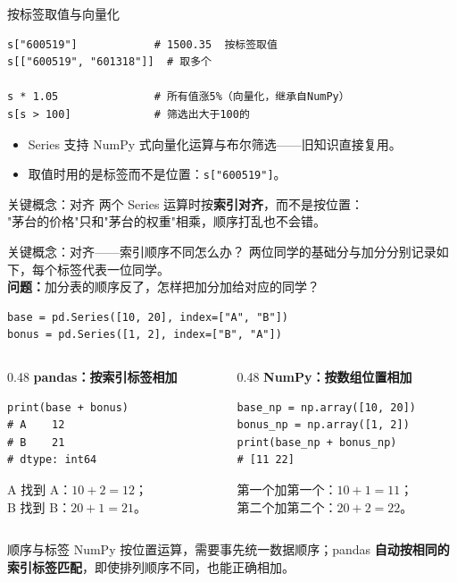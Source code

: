 \documentclass[9pt]{ctexbeamer}
\begin{document}
\begin{frame}[fragile]{按标签取值与向量化}
	\begin{lstlisting}
s["600519"]            # 1500.35  按标签取值
s[["600519", "601318"]]  # 取多个

s * 1.05               # 所有值涨5%（向量化，继承自NumPy）
s[s > 100]             # 筛选出大于100的
\end{lstlisting}
	\begin{itemize}
		\item Series 支持 NumPy 式向量化运算与布尔筛选——旧知识直接复用。
		\item 取值时用的是\alert{标签}而不是位置：\texttt{s["600519"]}。
	\end{itemize}
	\begin{alertblock}{关键概念：对齐}
		两个 Series 运算时按\textbf{索引对齐}，而不是按位置：\\
		"茅台的价格"只和"茅台的权重"相乘，顺序打乱也不会错。
	\end{alertblock}
\end{frame}


\begin{frame}[fragile]{关键概念：对齐——索引顺序不同怎么办？}
\small
两位同学的基础分与加分分别记录如下，每个标签代表一位同学。\\
\textbf{问题：}加分表的顺序反了，怎样把加分加给对应的同学？
\begin{lstlisting}
base = pd.Series([10, 20], index=["A", "B"])
bonus = pd.Series([1, 2], index=["B", "A"])
\end{lstlisting}
\begin{columns}[T]
\begin{column}{0.48\textwidth}
\textbf{pandas：按索引标签相加}
\begin{lstlisting}
print(base + bonus)
# A    12
# B    21
# dtype: int64
\end{lstlisting}
A 找到 A：$10+2=12$；\\
B 找到 B：$20+1=21$。
\end{column}
\begin{column}{0.48\textwidth}
\textbf{NumPy：按数组位置相加}
\begin{lstlisting}
base_np = np.array([10, 20])
bonus_np = np.array([1, 2])
print(base_np + bonus_np)
# [11 22]
\end{lstlisting}
第一个加第一个：$10+1=11$；\\
第二个加第二个：$20+2=22$。
\end{column}
\end{columns}
\begin{alertblock}{顺序与标签}
NumPy 按位置运算，需要事先统一数据顺序；pandas \textbf{自动按相同的索引标签匹配}，即使排列顺序不同，也能正确相加。
\end{alertblock}
\end{frame}
\end{document}
